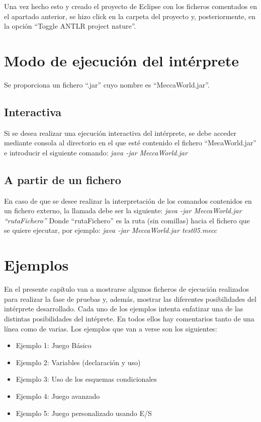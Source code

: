 \documentclass[a4paper,12pt,twoside,openright]{report}
\begin{document}
  Una vez hecho esto y creado el proyecto de Eclipse con los ficheros comentados en el apartado anterior, se hizo click en 
  la carpeta del proyecto y, posteriormente, en la opción ``Toggle ANTLR project nature''.
  
\chapter{Modo de ejecución del intérprete}
  Se proporciona un fichero ``.jar'' cuyo nombre es ``MeccaWorld.jar''.
  
  \section{Interactiva}
  Si se desea realizar una ejecución interactiva del intérprete, se debe acceder mediante consola al directorio en 
  el que esté contenido el fichero ``MecaWorld.jar'' e introducir el siguiente comando:\newline\newline
  \emph{java -jar MeccaWorld.jar}
  
  \section{A partir de un fichero}
  En caso de que se desee realizar la interpretación de los comandos contenidos en un fichero externo, la llamada debe ser 
  la siguiente:
  \newline
  \newline
  \emph{java -jar MeccaWorld.jar ``rutaFichero''}
  \newline
  \newline
  Donde ``rutaFichero'' es la ruta (sin comillas) hacia el fichero que se quiere ejecutar, por ejemplo:
  \newline
  \newline
  \emph{java -jar MeccaWorld.jar test05.mecc}
  
\chapter{Ejemplos}
  
  En el presente capítulo van a mostrarse algunos ficheros de ejecución realizados para realizar la fase de pruebas y, 
  además, mostrar las diferentes posibilidades del intérprete desarrollado. Cada uno de los ejemplos intenta enfatizar 
  una de las distintas posibilidades del intéprete. En todos ellos hay comentarios tanto de una línea como de varias.
  Los ejemplos que van a verse son los siguientes:
  \begin{itemize}
   \item Ejemplo 1: Juego Básico
   \item Ejemplo 2: Variables (declaración y uso)
   \item Ejemplo 3: Uso de los esquemas condicionales
   \item Ejemplo 4: Juego avanzado
   \item Ejemplo 5: Juego personalizado usando E/S
  \end{itemize}
\end{document}
